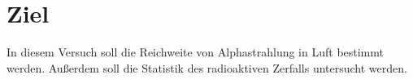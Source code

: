 \section{Ziel}
\label{sec:Ziel}
In diesem Versuch soll die Reichweite von Alphastrahlung in Luft
bestimmt werden. Außerdem soll die Statistik des radioaktiven
Zerfalls untersucht werden.
